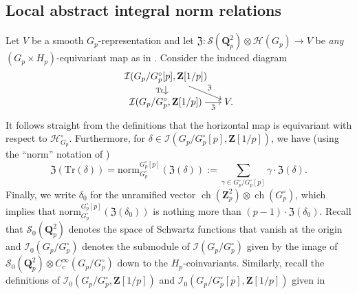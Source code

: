 \documentclass{amsart}%
\theoremstyle{plain}
\theoremstyle{plain}
\theoremstyle{remark}
\DeclareMathOperator{\ch}{ch}
\begin{document}
\subsection{Local abstract integral norm relations}\label{sec local norm relations} Let $V$ be a smooth $G_p$-representation and let $\mathfrak{Z}:\mathcal{S}(\mathbf{Q}_p^2)\otimes \mathcal{H}(G_p)\rightarrow V$ be \textit{any} $(G_p\times H_p)$-equivariant map as in . Consider the induced diagram
    \[\begin{tikzcd}[ampersand replacement=\&,cramped,sep=small]
	{\mathcal{I}(G_p/G_p^\circ[p],\mathbf{Z}[1/p])} \\
	{\mathcal{I}(G_p/G_p^\circ,\mathbf{Z}[1/p])} \& {V.}
	\arrow["{\mathrm{Tr}}"', from=1-1, to=2-1]
	\arrow["\mathfrak{Z}", from=1-1, to=2-2]
	\arrow["\mathfrak{Z}"', from=2-1, to=2-2]
\end{tikzcd}\]
It follows straight from the definitions that the horizontal map is equivariant with respect to $\mathcal{H}_{G_p}^\circ$. Furthermore, for $\delta\in \mathcal{I}(G_p/G_p^\circ[p],\mathbf{Z}[1/p])$, we have (using the ``norm'' notation of \cite{Loeffler_2021})
$$\mathfrak{Z}\left(\mathrm{Tr}\left(\delta\right)\right)=\mathrm{norm}^{G_p^\circ[p]}_{G_p^\circ}\left(\mathfrak{Z}\left(\delta\right)\right):=\sum_{\gamma\in G_p^\circ/G_p^\circ[p]}\gamma\cdot \mathfrak{Z}\left(\delta\right).$$
Finally, we write $\delta_0$ for the unramified vector $\ch(\mathbf{Z}_p^2)\otimes \ch(G_p^\circ)$, which implies that $\mathrm{norm}^{G_p^\circ[p]}_{G_p^\circ}\left(\mathfrak{Z}\left(\delta_0\right)\right)$ is nothing more than $(p-1)\cdot \mathfrak{Z}(\delta_0).$ Recall that $\mathcal{S}_0(\mathbf{Q}_p^2)$ denotes the space of Schwartz functions that vanish at the origin and $\mathcal{I}_0(G_p/G_p^\circ)$ denotes the submodule of $\mathcal{I}(G_p/G_p^\circ)$ given by the image of $\mathcal{S}_0(\mathbf{Q}_p^2)\otimes C_c^\infty(G_p/G_p^\circ)$ down to the $H_p$-coinvariants. Similarly, recall the definitions of $\mathcal{I}_0(G_p/G_p^\circ,\mathbf{Z}[1/p])$ and $\mathcal{I}_0(G_p/G_p^\circ[p],\mathbf{Z}[1/p])$ given in 
\end{document}
